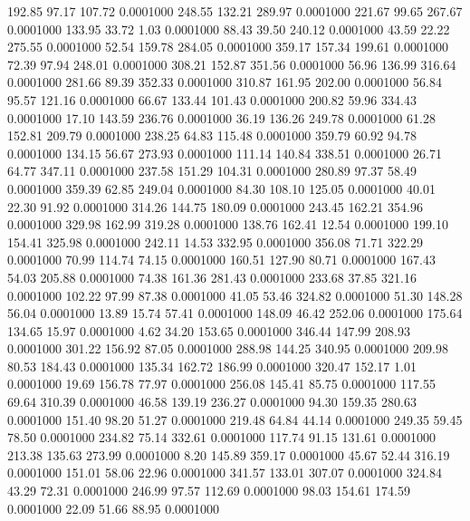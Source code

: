  192.85   97.17  107.72   0.0001000
 248.55  132.21  289.97   0.0001000
 221.67   99.65  267.67   0.0001000
 133.95   33.72    1.03   0.0001000
  88.43   39.50  240.12   0.0001000
  43.59   22.22  275.55   0.0001000
  52.54  159.78  284.05   0.0001000
 359.17  157.34  199.61   0.0001000
  72.39   97.94  248.01   0.0001000
 308.21  152.87  351.56   0.0001000
  56.96  136.99  316.64   0.0001000
 281.66   89.39  352.33   0.0001000
 310.87  161.95  202.00   0.0001000
  56.84   95.57  121.16   0.0001000
  66.67  133.44  101.43   0.0001000
 200.82   59.96  334.43   0.0001000
  17.10  143.59  236.76   0.0001000
  36.19  136.26  249.78   0.0001000
  61.28  152.81  209.79   0.0001000
 238.25   64.83  115.48   0.0001000
 359.79   60.92   94.78   0.0001000
 134.15   56.67  273.93   0.0001000
 111.14  140.84  338.51   0.0001000
  26.71   64.77  347.11   0.0001000
 237.58  151.29  104.31   0.0001000
 280.89   97.37   58.49   0.0001000
 359.39   62.85  249.04   0.0001000
  84.30  108.10  125.05   0.0001000
  40.01   22.30   91.92   0.0001000
 314.26  144.75  180.09   0.0001000
 243.45  162.21  354.96   0.0001000
 329.98  162.99  319.28   0.0001000
 138.76  162.41   12.54   0.0001000
 199.10  154.41  325.98   0.0001000
 242.11   14.53  332.95   0.0001000
 356.08   71.71  322.29   0.0001000
  70.99  114.74   74.15   0.0001000
 160.51  127.90   80.71   0.0001000
 167.43   54.03  205.88   0.0001000
  74.38  161.36  281.43   0.0001000
 233.68   37.85  321.16   0.0001000
 102.22   97.99   87.38   0.0001000
  41.05   53.46  324.82   0.0001000
  51.30  148.28   56.04   0.0001000
  13.89   15.74   57.41   0.0001000
 148.09   46.42  252.06   0.0001000
 175.64  134.65   15.97   0.0001000
   4.62   34.20  153.65   0.0001000
 346.44  147.99  208.93   0.0001000
 301.22  156.92   87.05   0.0001000
 288.98  144.25  340.95   0.0001000
 209.98   80.53  184.43   0.0001000
 135.34  162.72  186.99   0.0001000
 320.47  152.17    1.01   0.0001000
  19.69  156.78   77.97   0.0001000
 256.08  145.41   85.75   0.0001000
 117.55   69.64  310.39   0.0001000
  46.58  139.19  236.27   0.0001000
  94.30  159.35  280.63   0.0001000
 151.40   98.20   51.27   0.0001000
 219.48   64.84   44.14   0.0001000
 249.35   59.45   78.50   0.0001000
 234.82   75.14  332.61   0.0001000
 117.74   91.15  131.61   0.0001000
 213.38  135.63  273.99   0.0001000
   8.20  145.89  359.17   0.0001000
  45.67   52.44  316.19   0.0001000
 151.01   58.06   22.96   0.0001000
 341.57  133.01  307.07   0.0001000
 324.84   43.29   72.31   0.0001000
 246.99   97.57  112.69   0.0001000
  98.03  154.61  174.59   0.0001000
  22.09   51.66   88.95   0.0001000
